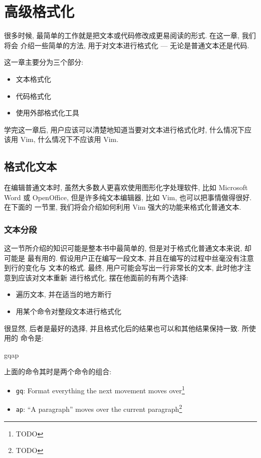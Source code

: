 \chapter{高级格式化}
\label{chap:advanced_formatting}

很多时候, 最简单的工作就是把文本或代码修改成更易阅读的形式. 在这一章, 我们将会
介绍一些简单的方法, 用于对文本进行格式化 --- 无论是普通文本还是代码.

这一章主要分为三个部分:
\begin{itemize}
    \item 文本格式化
    \item 代码格式化
    \item 使用外部格式化工具
\end{itemize}

学完这一章后, 用户应该可以清楚地知道当要对文本进行格式化时, 什么情况下应该用
Vim, 什么情况下不应该用 Vim.

\section{格式化文本}
\label{sec:formatting_text}

在编辑普通文本时, 虽然大多数人更喜欢使用图形化字处理软件, 比如 Microsoft Word
或 OpenOffice, 但是许多纯文本编辑器, 比如 Vim, 也可以把事情做得很好. 在下面的
一节里, 我们将会介绍如何利用 Vim 强大的功能来格式化普通文本.

\subsection{文本分段}
\label{subsec:putting_text_into_paragraphs}

这一节所介绍的知识可能是整本书中最简单的, 但是对于格式化普通文本来说, 却可能是
最有用的. 假设用户正在编写一段文本, 并且在编写的过程中丝毫没有注意到行的变化与
文本的格式. 最终, 用户可能会写出一行非常长的文本, 此时他才注意到应该对文本重新
进行格式化, 摆在他面前的有两个选择:
\begin{itemize}
    \item 遍历文本, 并在适当的地方断行
    \item 用某个命令对整段文本进行格式化
\end{itemize}
很显然, 后者是最好的选择, 并且格式化后的结果也可以和其他结果保持一致. 所使用的
命令是:
\begin{vimcode}
gqap
\end{vimcode}
上面的命令其时是两个命令的组合:
\begin{itemize}
    \item \texttt{gq}: Format everything the next movement moves
        over\footnote{TODO}
    \item \texttt{ap}: ``A paragraph'' moves over the current
        paragraph\footnote{TODO}
\end{itemize}

